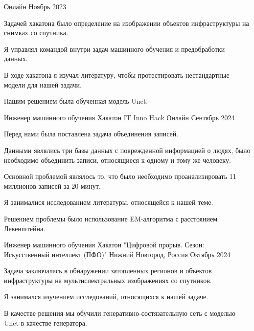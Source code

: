 \begin{cventries}
{Онлайн} %
{Ноябрь 2023} %
{
  \begin{cvitems} %
    \item {Задачей хакатона было определение на изображении объектов инфраструктуры на снимках со спутника. }
    \item {Я управлял командой внутри задач машинного обучения и предобработки данных. }
    \item {В ходе хакатона я изучал литературу, чтобы протестировать нестандартные модели для нашей задачи. }
    \item {Нашим решением была обученная модель Unet. } 
  \end{cvitems}
}
\cventry
{Инженер машинного обучения} %
{Хакатон IT Inno Hack} %
{Онлайн} %
{Сентябрь 2024} %
{
  \begin{cvitems} %
    \item {Перед нами была поставлена задача объединения записей. }
    \item {Данными являлись три базы данных с поврежденной информацией о людях, было необходимо объединить записи, относящиеся к одному и тому же человеку. }
    \item {Основной проблемой являлось то, что было необходимо проанализировать 11 миллионов записей за 20 минут. }
    \item {Я занималися исследованием литературы, относящейся к нашей теме. }
    \item {Решением проблемы было использование EM-алгоритма с расстоянием Левенштейна.}
  \end{cvitems}
}
\cventry
{Инженер машинного обучения} %
{Хакатон "Цифровой прорыв. Сезон: Искусственный интеллект (ПФО)"} %
{Нижний Новгород, Россия} %
{Октябрь 2024} %
{
  \begin{cvitems} %
    \item {Задача заключалась в обнаружении затопленных регионов и объектов инфраструктуры на мультиспектральных изображениях со спутников. }
    \item {Я занимался изучением исследований, относящихся к нашей задаче. }
    \item {В качестве решения мы обучили генеративно-состязательную сеть с моделью Unet в качестве генератора. } 
  \end{cvitems}
}
\end{cventries}

